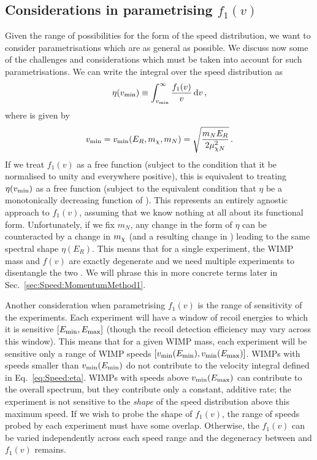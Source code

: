 \subsection{Considerations in parametrising $f_1(v)$}


Given the range of possibilities for the form of the speed distribution, we want to consider parametrisations which are as general as possible. We discuss now some of the challenges and considerations which must be taken into account for such parametrisations. We can write the integral over the speed distribution as
\begin{equation}
\label{eq:Speed:eta}
\eta(\vmin) \equiv \int_{\vmin}^\infty \frac{f_1(v)}{v}\,\mathrm{d}v\,,
\end{equation}
where \vmin is given by
\begin{equation}
v_\textrm{min} = v_\textrm{min}(E_R, \mchi, m_N) = \sqrt{\frac{m_N E_R}{2 \mu_{\chi N}^2}}\,.
\end{equation}
If we treat $f_1(v)$ as a free function (subject to the condition that it be normalised to unity and everywhere positive), this is equivalent to treating $\eta(\vmin)$ as a free function (subject to the equivalent condition that $\eta$ be a monotonically decreasing function of \vmin). This represents an entirely agnostic approach to $f_1(v)$, assuming that we know nothing at all about its functional form. Unfortunately, if we fix $m_N$, any change in the form of $\eta$ can be counteracted by a change in $\mchi$ (and a resulting change in \vmin) leading to the same spectral shape $\eta(E_R)$. This means that for a single experiment, the WIMP mass and $f(v)$ are exactly degenerate and we need multiple experiments to disentangle the two \cite{Drees:2008}. We will phrase this in more concrete terms later in Sec.~\ref{sec:Speed:MomentumMethod1}.

Another consideration when parametrising $f_1(v)$ is the range of sensitivity of the experiments. Each experiment will have a window of recoil energies to which it is sensitive $\left[\Emin, \Emax\right]$ (though the recoil detection efficiency may vary across this window). This means that for a given WIMP mass, each experiment will be sensitive only a range of WIMP speeds $\left[\vmin(\Emin), \vmin(\Emax)\right]$. WIMPs with speeds smaller than $\vmin(\Emin)$ do not contribute to the velocity integral defined in Eq.~\ref{eq:Speed:eta}. WIMPs with speeds above $\vmin(\Emax)$ can contribute to the overall spectrum, but they contribute only a constant, additive rate; the experiment is not sensitive to the \textit{shape} of the speed distribution above this maximum speed. If we wish to probe the shape of $f_1(v)$, the range of speeds probed by each experiment must have some overlap. Otherwise, the $f_1(v)$ can be varied independently across each speed range and the degeneracy between \mchi and $f_1(v)$ remains.

